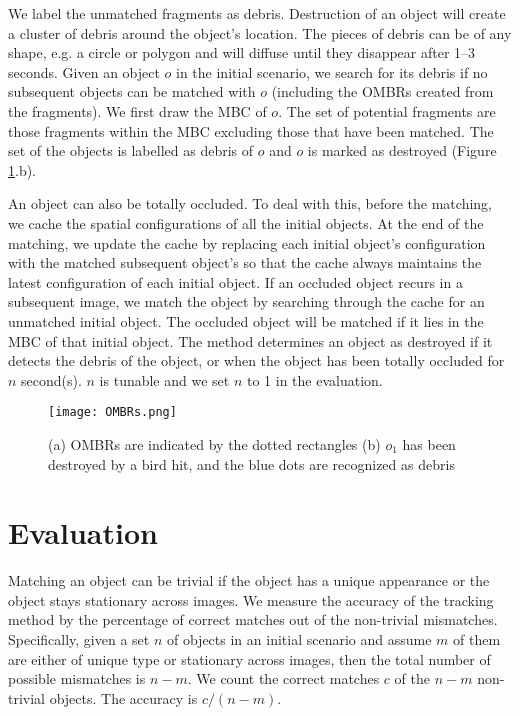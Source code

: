 \documentclass[letterpaper]{article}
\begin{document}
We label the unmatched fragments as debris. Destruction of an object will create a cluster of debris around the object's location. The pieces of debris can be of any shape, e.g. a circle or polygon and will diffuse until they disappear after 1--3 seconds. Given an object $o$ in the initial scenario, we search for its debris if no subsequent objects can be matched with $o$ (including the OMBRs created from the fragments). We first draw the MBC of $o$. The set of potential fragments are those fragments within the MBC excluding those that have been matched. The set of the objects is labelled as debris of $o$ and $o$ is marked as destroyed (Figure \ref{OMBRs}.b).

An object can also be totally occluded. To deal with this, before the matching, we cache the spatial configurations of all the initial objects. At the end of the matching, we update the cache by replacing each initial object's configuration with the matched subsequent object's so that the cache always maintains the latest configuration of each initial object. If an occluded object recurs in a subsequent image, we match the object by searching through the cache for an unmatched initial object. The occluded object will be matched if it lies in the MBC of that initial object. 
The method determines an object as destroyed if it detects the debris of the object, or when the object has been totally occluded for $n$ second(s). $n$ is tunable and we set $n$ to 1 in the evaluation.  
 
\begin{figure}[t!]
\centering\texttt{[image: OMBRs.png]}\caption{(a) OMBRs are indicated by the dotted rectangles (b) $o_1$ has been destroyed by a bird hit, and the blue dots are recognized as debris}  
\label{OMBRs}
\end{figure}


\section{Evaluation}

Matching an object can be trivial if the object has a unique appearance or the object stays stationary across images. We measure the accuracy of the tracking method by the percentage of correct matches out of the non-trivial mismatches. Specifically, given a set $n$ of objects in an initial scenario and assume $m$ of them are either of unique type or stationary across images, then the total number of possible mismatches is $n - m$. We count the correct matches $c$ of the $n - m$ non-trivial objects. The accuracy is  $c / (n - m)$.
\end{document}
